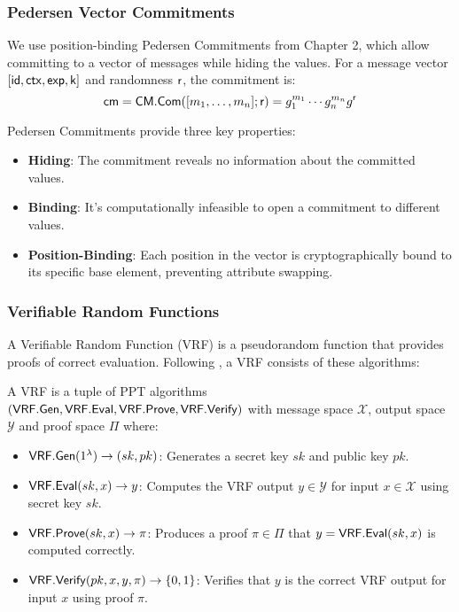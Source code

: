 \subsubsection{Pedersen Vector Commitments}
We use position-binding Pedersen Commitments from Chapter 2, which allow committing to a vector of messages while hiding the values. For a message vector $[\mathsf{id}, \mathsf{ctx}, \mathsf{exp}, \mathsf{k}]$ and randomness $\mathsf{r}$, the commitment is:
\[
\mathsf{cm} = \mathsf{CM.Com}([m_1, \ldots, m_n];\mathsf{r}) = g_1^{m_1} \cdots g_n^{m_n} g^{\mathsf{r}}
\]

Pedersen Commitments provide three key properties:
\begin{itemize}
    \item \textbf{Hiding}: The commitment reveals no information about the committed values.
    \item \textbf{Binding}: It's computationally infeasible to open a commitment to different values.
    \item \textbf{Position-Binding}: Each position in the vector is cryptographically bound to its specific base element, preventing attribute swapping.
\end{itemize}


\subsubsection{Verifiable Random Functions}
A Verifiable Random Function (VRF) \cite{micali_verifiable_1999, hutchison_verifiable_2005} is a pseudorandom function that provides proofs of correct evaluation. Following \cite{bitansky_verifiable_2020}, a VRF consists of these algorithms:

\begin{definition}
A VRF is a tuple of PPT algorithms \\
$(\mathsf{VRF.Gen}, \mathsf{VRF.Eval}, \mathsf{VRF.Prove}, \mathsf{VRF.Verify})$ with message space $\mathcal{X}$, output space $\mathcal{Y}$ and proof space $\Pi$ where:
\begin{itemize}
    \item $\mathsf{VRF.Gen}(1^\lambda) \to (sk, pk)$: Generates a secret key $sk$ and public key $pk$.
    \item $\mathsf{VRF.Eval}(sk,x) \to y$: Computes the VRF output $y \in \mathcal{Y}$ for input $x \in \mathcal{X}$ using secret key $sk$.
    \item $\mathsf{VRF.Prove}(sk,x) \to \pi$: Produces a proof $\pi \in \Pi$ that $y = \mathsf{VRF.Eval}(sk,x)$ is computed correctly.
    \item $\mathsf{VRF.Verify}(pk,x,y,\pi) \to \{0,1\}$: Verifies that $y$ is the correct VRF output for input $x$ using proof $\pi$.
\end{itemize}
\end{definition}

